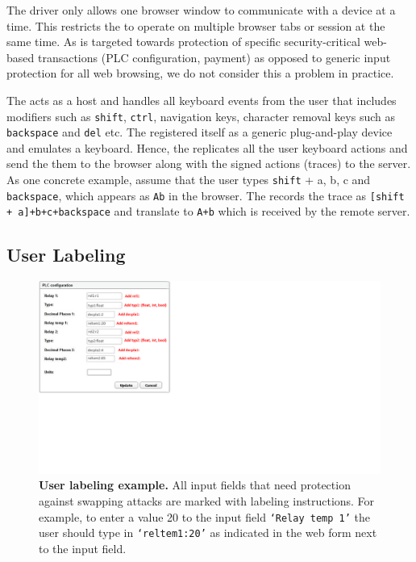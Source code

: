  The \webusb driver only allows one browser window to communicate with a \usb device at a time. This restricts the \device to operate on multiple browser tabs or session at the same time. As \name is targeted towards protection of specific security-critical web-based transactions (PLC configuration, payment) as opposed to generic input protection for all web browsing, we do not consider this a problem in practice.

The \device acts as a \usb host and handles all keyboard events from the user that includes modifiers such as \texttt{shift}, \texttt{ctrl}, navigation keys, character removal keys such as \texttt{backspace} and \texttt{del} etc. The \device registered itself as a generic \usb plug-and-play device and emulates a keyboard. Hence, the \device replicates all the user keyboard actions and send the them to the browser along with the signed actions (traces) to the server. 
%
As one concrete example, assume that the user types \texttt{shift} + a, b, c and \texttt{backspace}, which appears as \texttt{Ab} in the browser. The \device records the trace as \texttt{[shift + a]+b+c+backspace} and translate to \texttt{A+b} which is received by the remote server. 
\subsection{User Labeling}
\label{sec:integriKey:labeling}

\begin{figure}[t]
 \centering
 \includegraphics[trim={0 7cm 20cm 0},clip,width=0.65\linewidth]{chapters/IntegriKey/images/labelExample_revised.pdf}
 \caption[User labeling example]{\textbf{User labeling example.} All input fields that need protection against swapping attacks are marked with labeling instructions. For example, to enter a value 20 to the input field \texttt{`Relay temp 1'} the user should type in \texttt{`reltem1:20'} as indicated in the web form next to the input field.} 
 \vspace{-10pt}
 \label{fig:labelEx}
\end{figure}

